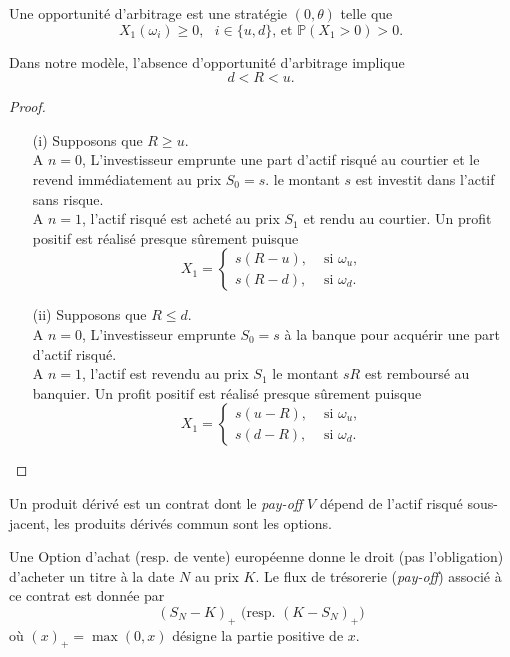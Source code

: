 \begin{definition}\label{def:opportunite_arbitrage}
Une opportunité d'arbitrage est une stratégie $(0,\theta)$ telle que 
$$
X_1(\omega_i)\geq0,\text{ }i\in\{u,d\}\text{, et }\mathbb{P}(X_1>0) > 0.
$$

\end{definition}
\begin{prop}
Dans notre modèle, l'absence d'opportunité d'arbitrage implique
$$
d<R<u.
$$
\end{prop}
\begin{proof}
\begin{itemize}
    \item[(i)] Supposons que $R\geq u$. \\

    A $n=0$, L'investisseur emprunte une part d'actif risqué au courtier et le revend immédiatement au prix $S_0 = s$. le montant $s$ est investit dans l'actif sans risque.\\

    A $n=1$, l'actif risqué est acheté au prix $S_1$ et rendu au courtier. Un profit positif est réalisé presque sûrement puisque
    $$
    X_1 = \begin{cases}
    s(R-u),&\text{ si }\omega_u,\\
    s(R-d),&\text{ si }\omega_d.
    \end{cases}
    $$ 
    \item[(ii)] Supposons que $R\leq d$.\\

    A $n=0$, L'investisseur emprunte $S_0 = s$ à la banque pour acquérir une part d'actif risqué.\\ 

    A $n=1$, l'actif est revendu au prix $S_1$ le montant $sR$ est remboursé au banquier. Un profit positif est réalisé presque sûrement puisque
    $$
    X_1 = \begin{cases}
    s(u-R),&\text{ si }\omega_u,\\
    s(d-R),&\text{ si }\omega_d.
    \end{cases}
    $$
\end{itemize}
\end{proof}
Un produit dérivé est un contrat dont le \textit{pay-off} $V$ dépend de l'actif risqué sous-jacent, les produits dérivés commun sont les options.
\begin{definition}\label{def:eu_option}
Une Option d'achat (resp. de vente) européenne donne le droit (pas l'obligation) d'acheter un titre à la date $N$ au prix $K$. Le flux de trésorerie (\textit{pay-off}) associé à ce contrat est donnée par 
$$
(S_N-K)_{+}\text{ (resp. }(K-S_N)_{+})
$$ 
où $(x)_+ = \max(0, x)$ désigne la partie positive de $x$.
\end{definition}
